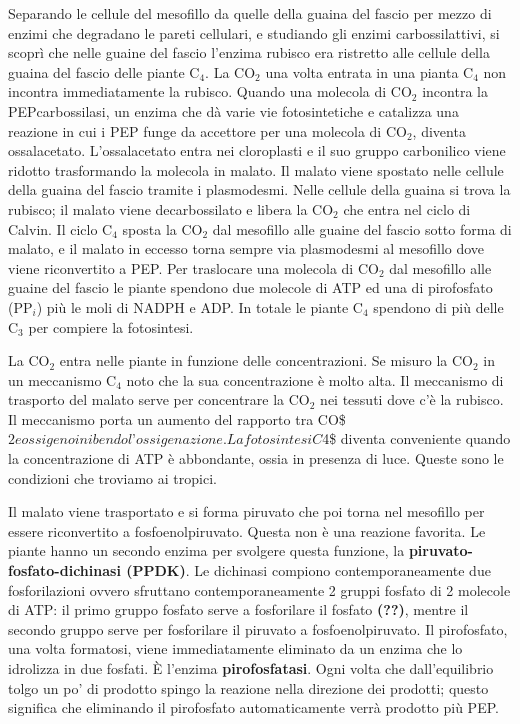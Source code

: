 \documentclass[]{article}
\begin{document}
Separando le cellule del mesofillo da quelle della guaina del fascio per
mezzo di enzimi che degradano le pareti cellulari, e studiando gli
enzimi carbossilattivi, si scoprì che nelle guaine del fascio l'enzima
rubisco era ristretto alle cellule della guaina del fascio delle piante
C$_4$. La CO$_2$ una volta entrata in una pianta C$_4$ non incontra
immediatamente la rubisco. Quando una molecola di CO$_2$ incontra la
PEPcarbossilasi, un enzima che dà varie vie fotosintetiche e catalizza
una reazione in cui i PEP funge da accettore per una molecola di CO$_2$,
diventa ossalacetato. L'ossalacetato entra nei cloroplasti e il suo
gruppo carbonilico viene ridotto trasformando la molecola in malato. Il
malato viene spostato nelle cellule della guaina del fascio tramite i
plasmodesmi. Nelle cellule della guaina si trova la rubisco; il malato
viene decarbossilato e libera la CO$_2$ che entra nel ciclo di Calvin.
Il ciclo C$_4$ sposta la CO$_2$ dal mesofillo alle guaine del fascio
sotto forma di malato, e il malato in eccesso torna sempre via
plasmodesmi al mesofillo dove viene riconvertito a PEP. Per traslocare
una molecola di CO$_2$ dal mesofillo alle guaine del fascio le piante
spendono due molecole di ATP ed una di pirofosfato (PP$_i$) più le moli
di NADPH e ADP. In totale le piante C$_4$ spendono di più delle C$_3$
per compiere la fotosintesi.

La CO$_2$ entra nelle piante in funzione delle concentrazioni. Se misuro
la CO$_2$ in un meccanismo C$_4$ noto che la sua concentrazione è molto
alta. Il meccanismo di trasporto del malato serve per concentrare la
CO$_2$ nei tessuti dove c'è la rubisco. Il meccanismo porta un aumento
del rapporto tra
CO\$\emph{$2 e ossigeno inibendo l’ossigenazione. La fotosintesi C$}4\$
diventa conveniente quando la concentrazione di ATP è abbondante, ossia
in presenza di luce. Queste sono le condizioni che troviamo ai tropici.

Il malato viene trasportato e si forma piruvato che poi torna nel
mesofillo per essere riconvertito a fosfoenolpiruvato. Questa non è una
reazione favorita. Le piante hanno un secondo enzima per svolgere questa
funzione, la \textbf{piruvato-fosfato-dichinasi (PPDK)}. Le dichinasi
compiono contemporaneamente due fosforilazioni ovvero sfruttano
contemporaneamente 2 gruppi fosfato di 2 molecole di ATP: il primo
gruppo fosfato serve a fosforilare il fosfato \textbf{(??)}, mentre il
secondo gruppo serve per fosforilare il piruvato a fosfoenolpiruvato. Il
pirofosfato, una volta formatosi, viene immediatamente eliminato da un
enzima che lo idrolizza in due fosfati. È l'enzima
\textbf{pirofosfatasi}. Ogni volta che dall'equilibrio tolgo un po' di
prodotto spingo la reazione nella direzione dei prodotti; questo
significa che eliminando il pirofosfato automaticamente verrà prodotto
più PEP.
\end{document}
